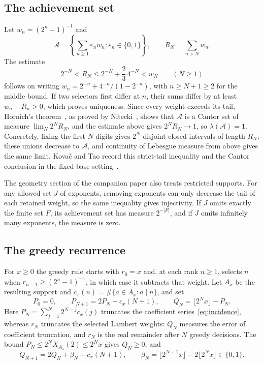\documentclass[11pt]{article}
\newcommand{\Ach}{\mathcal A}
\begin{document}
\subsection{The achievement set}\label{sec:geometry}
Let $w_n=(2^n-1)^{-1}$ and
\[
 \Ach=\left\{\sum_{n\ge1}\varepsilon_nw_n:
                   \varepsilon_n\in\{0,1\}\right\},\qquad
 R_N=\sum_{n>N}w_n.
\]
The estimate
\[
 2^{-N}<R_N\le2^{-N}+\frac23\,4^{-N}<w_N\qquad(N\ge1)
\]
follows on writing $w_n=2^{-n}+4^{-n}/(1-2^{-n})$, with
$n\ge N+1\ge2$ for the middle bound. If two selectors first differ at
$n$, their sums differ by at least $w_n-R_n>0$, which proves
uniqueness. Since every weight exceeds its tail, Hornich's
theorem~\cite{hornich1941}, as proved by
Nitecki~\cite[Theorem~4(1), p.~9]{nitecki2013}, shows that $\Ach$ is a
Cantor set of measure $\lim_N2^NR_N$, and the estimate above gives
$2^NR_N\to1$, so $\lambda(\Ach)=1$. Concretely, fixing the first $N$
digits gives $2^N$ disjoint closed intervals of length $R_N$; these
unions decrease to $\Ach$, and continuity of Lebesgue measure from
above gives the same limit. Kova\v{c} and Tao record this strict-tail
inequality and the Cantor conclusion in the fixed-base
setting~\cite[Remark~4.1]{kovactao}.

The
{geometry section of the companion paper} also treats restricted
supports. For any allowed set $J$ of exponents, removing exponents can
only decrease the tail of each retained weight, so the same inequality
gives injectivity. If $J$ omits exactly the finite set $F$, its
achievement set has measure $2^{-|F|}$, and if $J$ omits infinitely
many exponents, the measure is zero.

\subsection{The greedy recurrence}\label{sec:actual-repairs}
For $x\ge0$ the greedy rule starts with $r_0=x$ and, at each rank
$n\ge1$, selects $n$ when $r_{n-1}\ge(2^n-1)^{-1}$, in which case it
subtracts that weight. Let $A_x$ be the resulting support and
$c_x(n)=\#\{a\in A_x:a\mid n\}$, and set
\[
 P_0=0,\qquad P_{N+1}=2P_N+c_x(N+1),\qquad
 Q_N=\lfloor2^Nx\rfloor-P_N.
\]
Here $P_N=\sum_{j=1}^N2^{N-j}c_x(j)$ truncates the coefficient
series~\eqref{eq:incidence}, whereas $r_N$ truncates the selected
Lambert weights: $Q_N$ measures the error of coefficient truncation,
and $r_N$ is the real remainder after $N$ greedy decisions. The bound
$P_N\le2^NX_{A_x}(2)\le2^Nx$ gives $Q_N\ge0$, and
\begin{equation}
 Q_{N+1}=2Q_N+\beta_N-c_x(N+1),\qquad
 \beta_N=\lfloor2^{N+1}x\rfloor-2\lfloor2^Nx\rfloor\in\{0,1\}.
 \label{eq:actual-repair-recurrence}
\end{equation}
\end{document}
